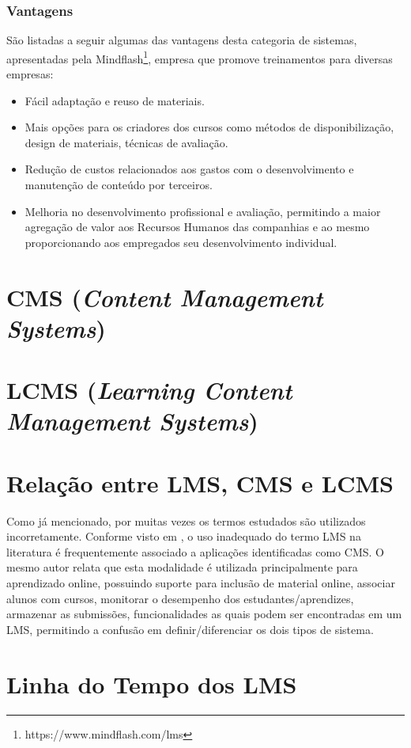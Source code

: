 \documentclass[12pt]{article}
\begin{document}
\subsubsection{Vantagens}

São listadas a seguir algumas das vantagens desta categoria de sistemas, apresentadas pela Mindflash\footnote{https://www.mindflash.com/lms}, 
empresa que promove treinamentos para diversas empresas:

\begin{itemize}
 \item Fácil adaptação e reuso de materiais.
 \item Mais opções para os criadores dos cursos como métodos de disponibilização, design de materiais, técnicas de avaliação.
 \item Redução de custos relacionados aos gastos com o desenvolvimento e manutenção de conteúdo por terceiros.
 \item Melhoria no desenvolvimento profissional e avaliação, permitindo a maior agregação de valor aos Recursos Humanos das companhias e ao mesmo 
 proporcionando aos empregados seu desenvolvimento individual.
\end{itemize}

\section{CMS (\textit{Content Management Systems})}

\section{LCMS (\textit{Learning Content Management Systems})}

\section{Relação entre LMS, CMS e LCMS}

Como já mencionado, por muitas vezes os termos estudados são utilizados incorretamente. Conforme visto em \cite{watson2007learning}, o uso 
inadequado do termo LMS na literatura é frequentemente associado a aplicações identificadas como CMS. O mesmo autor relata que esta modalidade é 
utilizada principalmente para aprendizado online, possuindo suporte para inclusão de material online, associar alunos com cursos, monitorar o 
desempenho dos estudantes/aprendizes, armazenar as submissões, funcionalidades as quais podem ser encontradas em um LMS, permitindo a confusão em 
definir/diferenciar os dois tipos de sistema.




\newpage
\appendix
\section{Linha do Tempo dos LMS}

\end{document}
